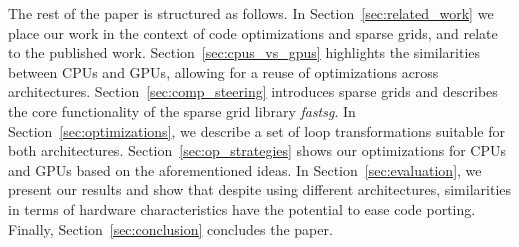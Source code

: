The rest of the paper is structured as follows. In
Section~\ref{sec:related_work} we place our work in the context of code
optimizations and sparse grids, and relate to the published work.
Section~\ref{sec:cpus_vs_gpus} highlights the similarities between CPUs and
GPUs, allowing for a reuse of optimizations across architectures.
Section~\ref{sec:comp_steering} introduces sparse grids and describes the core
functionality of the sparse grid library \textit{fastsg}. In
Section~\ref{sec:optimizations}, we describe a set of loop transformations
suitable for both architectures. Section~\ref{sec:op_strategies} shows our
optimizations for CPUs and GPUs based on the aforementioned ideas. In
Section~\ref{sec:evaluation}, we present our results and show that despite using
different architectures, similarities in terms of hardware characteristics have
the potential to ease code porting. Finally, Section~\ref{sec:conclusion}
concludes the paper.
